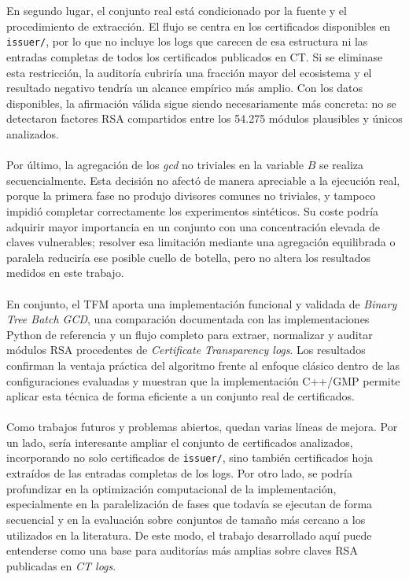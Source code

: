\\
\\
En segundo lugar, el conjunto real está condicionado por la fuente y el procedimiento de extracción. El flujo se centra en los certificados disponibles en \texttt{issuer/}, por lo que no incluye los logs que carecen de esa estructura ni las entradas completas de todos los certificados publicados en CT. Si se eliminase esta restricción, la auditoría cubriría una fracción mayor del ecosistema y el resultado negativo tendría un alcance empírico más amplio. Con los datos disponibles, la afirmación válida sigue siendo necesariamente más concreta: no se detectaron factores RSA compartidos entre los 54.275 módulos plausibles y únicos analizados.
\\
\\
Por último, la agregación de los \textit{gcd} no triviales en la variable \(B\) se realiza secuencialmente. Esta decisión no afectó de manera apreciable a la ejecución real, porque la primera fase no produjo divisores comunes no triviales, y tampoco impidió completar correctamente los experimentos sintéticos. Su coste podría adquirir mayor importancia en un conjunto con una concentración elevada de claves vulnerables; resolver esa limitación mediante una agregación equilibrada o paralela reduciría ese posible cuello de botella, pero no altera los resultados medidos en este trabajo.
\\
\\
En conjunto, el TFM aporta una implementación funcional y validada de \textit{Binary Tree Batch GCD}, una comparación documentada con las implementaciones Python de referencia y un flujo completo para extraer, normalizar y auditar módulos RSA procedentes de \textit{Certificate Transparency logs}. Los resultados confirman la ventaja práctica del algoritmo frente al enfoque clásico dentro de las configuraciones evaluadas y muestran que la implementación C++/GMP permite aplicar esta técnica de forma eficiente a un conjunto real de certificados.
\\
\\
Como trabajos futuros y problemas abiertos, quedan varias líneas de mejora. Por un lado, sería interesante ampliar el conjunto de certificados analizados, incorporando no solo certificados de \texttt{issuer/}, sino también certificados hoja extraídos de las entradas completas de los logs. Por otro lado, se podría profundizar en la optimización computacional de la implementación, especialmente en la paralelización de fases que todavía se ejecutan de forma secuencial y en la evaluación sobre conjuntos de tamaño más cercano a los utilizados en la literatura. De este modo, el trabajo desarrollado aquí puede entenderse como una base para auditorías más amplias sobre claves RSA publicadas en \textit{CT logs}.
